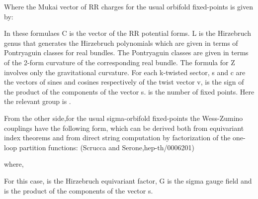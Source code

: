 \documentclass[a4paper,a4paper]{article}
\begin{document}
Where the Mukai vector of RR charges for the usual orbifold fixed-points is given by:

\begin{center}
{  \coordHE{} }
\end{center}

In these  formulaes C is the vector of the RR potential forms. L is the Hirzebruch genus that generates the Hirzebruch polynomials which are given in terms of Pontryaguin classes for real bundles. The Pontryaguin classes are given in terms of the 2-form curvature of the corresponding real bundle. The formula for Z involves only the gravitational curvature. For each k-twisted sector, s and c are the vectors of sines and cosines respectively of the twist vector v, \myHighlight{$\epsilon$}\coordHE{} is the sign of the product of the components of the vector  s. \coordHE{} is the number of fixed points. Here the relevant group is \coordHE{}.

From the other side,for the usual sigma-orbifold fixed-points the Wess-Zumino couplings have the following form, which can be derived both from equivariant index theorems and from direct string computation by factorization of the one-loop partition functions: (Scrucca and Serone,hep-th/0006201)
\begin{center}
{  \coordHE{} }
\end{center}     
where,
\begin{center}
{  \coordHE{} }
\end{center}
For this case, \coordHE{} is the Hirzebruch equivariant factor, G is the sigma gauge field and \coordHE{} is the product of the components of the vector s.
\end{document}
